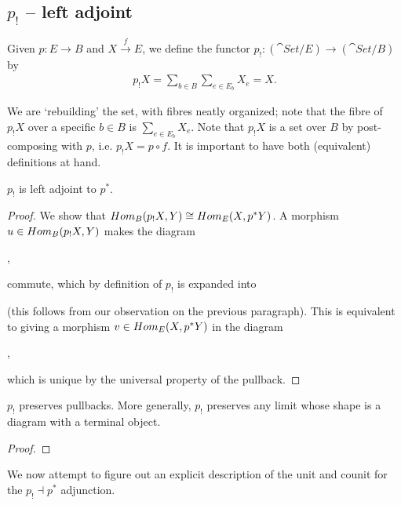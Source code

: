 \subsection{$p_!$ -- left adjoint}
Given $p: E\to B$ and $X\overset{f}{\to} E$, we define the functor $p_! : (\cat{Set}/ E)\to(\cat{Set}/ B)$ by
\begin{align*}
	p_!X = \sum_{b\in B} \sum_{e\in E_b} X_{e} = X.
\end{align*}

We are `rebuilding' the set, with fibres neatly organized; note that the fibre of $p_!X$ over a specific $b\in B$ is $\sum_{e\in E_b} X_e$. Note that $p_!X$ is a set over $B$ by post-composing with $p$, i.e. $p_!X = p \circ f$. It is important to have both (equivalent) definitions at hand.

\begin{proposition}
	$p_!$ is left adjoint to $p^*$.
\end{proposition}
\begin{proof}
	We show that $Hom_B(p_!X,Y) \cong Hom_E(X, p^*Y)$. A morphism $u\in Hom_B(p_!X,Y)$ makes the diagram
	\begin{center}
	,
	\end{center}
	commute, which by definition of $p_!$ is expanded into
	\begin{center}
	\end{center}
	(this follows from our observation on the previous paragraph). This is equivalent to giving a morphism $v\in Hom_E(X,p^*Y)$ in the diagram
	\begin{center}
	,
	\end{center}
	which is unique by the universal property of the pullback.
\end{proof}

\begin{lemma}
	$p_!$ preserves pullbacks. More generally, $p_!$ preserves any limit whose shape is a diagram with a terminal object.
\end{lemma}
\begin{proof}
	
\end{proof}

We now attempt to figure out an explicit description of the unit and counit for the $p_! \dashv p^*$ adjunction.

\pagebreak
